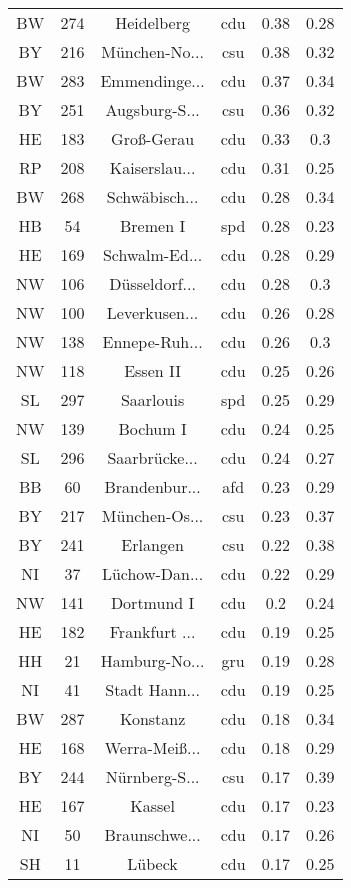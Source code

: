 \begin{table}[!htbp]
\begin{tabular}{@{\extracolsep{5pt}} cccccc}
BW & 274 & Heidelberg & cdu & 0.38 & 0.28 \\ 
BY & 216 & München-No... & csu & 0.38 & 0.32 \\ 
BW & 283 & Emmendinge... & cdu & 0.37 & 0.34 \\ 
BY & 251 & Augsburg-S... & csu & 0.36 & 0.32 \\ 
HE & 183 & Groß-Gerau & cdu & 0.33 & 0.3 \\ 
RP & 208 & Kaiserslau... & cdu & 0.31 & 0.25 \\ 
BW & 268 & Schwäbisch... & cdu & 0.28 & 0.34 \\ 
HB & 54 & Bremen I & spd & 0.28 & 0.23 \\ 
HE & 169 & Schwalm-Ed... & cdu & 0.28 & 0.29 \\ 
NW & 106 & Düsseldorf... & cdu & 0.28 & 0.3 \\ 
NW & 100 & Leverkusen... & cdu & 0.26 & 0.28 \\ 
NW & 138 & Ennepe-Ruh... & cdu & 0.26 & 0.3 \\ 
NW & 118 & Essen II & cdu & 0.25 & 0.26 \\ 
SL & 297 & Saarlouis & spd & 0.25 & 0.29 \\ 
NW & 139 & Bochum I & cdu & 0.24 & 0.25 \\ 
SL & 296 & Saarbrücke... & cdu & 0.24 & 0.27 \\ 
BB & 60 & Brandenbur... & afd & 0.23 & 0.29 \\ 
BY & 217 & München-Os... & csu & 0.23 & 0.37 \\ 
BY & 241 & Erlangen & csu & 0.22 & 0.38 \\ 
NI & 37 & Lüchow-Dan... & cdu & 0.22 & 0.29 \\ 
NW & 141 & Dortmund I & cdu & 0.2 & 0.24 \\ 
HE & 182 & Frankfurt ... & cdu & 0.19 & 0.25 \\ 
HH & 21 & Hamburg-No... & gru & 0.19 & 0.28 \\ 
NI & 41 & Stadt Hann... & cdu & 0.19 & 0.25 \\ 
BW & 287 & Konstanz & cdu & 0.18 & 0.34 \\ 
HE & 168 & Werra-Meiß... & cdu & 0.18 & 0.29 \\ 
BY & 244 & Nürnberg-S... & csu & 0.17 & 0.39 \\ 
HE & 167 & Kassel & cdu & 0.17 & 0.23 \\ 
NI & 50 & Braunschwe... & cdu & 0.17 & 0.26 \\ 
SH & 11 & Lübeck & cdu & 0.17 & 0.25 \\ 

\end{tabular}
\end{table}
